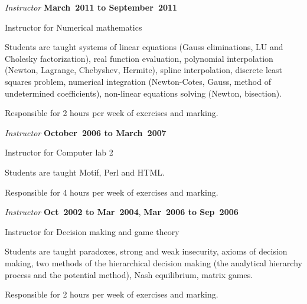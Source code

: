 \documentclass[10pt]{article}
\begin{document}
\begin{outerlist}
\item[] \textit{Instructor} \hfill \textbf{March~2011 to September~2011}
  \begin{innerlist}
    \item Instructor for Numerical mathematics
      \begin{innerlist}
        \item Students are taught systems of linear equations (Gauss eliminations, LU and Cholesky factorization), real function evaluation, polynomial interpolation (Newton, Lagrange, Chebyshev, Hermite), spline interpolation, discrete least squares problem, numerical integration (Newton-Cotes, Gauss, method of undetermined coefficients), non-linear equations solving (Newton, bisection).
        \item Responsible for 2 hours per week of exercises and marking.
      \end{innerlist}
  \end{innerlist}

\item[] \textit{Instructor} \hfill \textbf{October~2006 to March~2007}
  \begin{innerlist}
    \item Instructor for Computer lab 2
      \begin{innerlist}
        \item Students are taught Motif, Perl and HTML.
        \item Responsible for 4 hours per week of exercises and marking.
      \end{innerlist}
  \end{innerlist}

\item[] \textit{Instructor} \hfill \textbf{Oct~2002 to Mar~2004}, \textbf{Mar~2006 to Sep~2006}
  \begin{innerlist}
    \item Instructor for Decision making and game theory
      \begin{innerlist}
        \item Students are taught paradoxes, strong and weak insecurity, axioms of decision making, two methods of the hierarchical decision making (the analytical hierarchy process and the potential method), Nash equilibrium, matrix games.
        \item Responsible for 2 hours per week of exercises and marking.
      \end{innerlist}
  \end{innerlist}


\end{outerlist}
\end{document}
